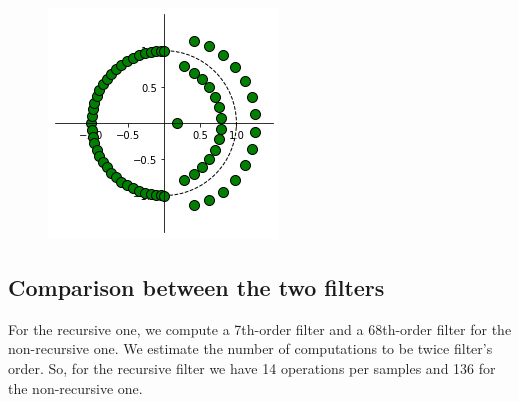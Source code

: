 \documentclass[]{article}
\begin{document}
\begin{figure}[H]
    \centering
    \includegraphics[scale=0.7]{q26.png}
\end{figure}

\subsection*{Comparison between the two filters}

For the recursive one, we compute a 7th-order filter and a 68th-order filter for the non-recursive one.
We estimate the number of computations to be twice filter's order. So, for the recursive filter
we have 14 operations per samples and 136 for the non-recursive one.
\end{document}
